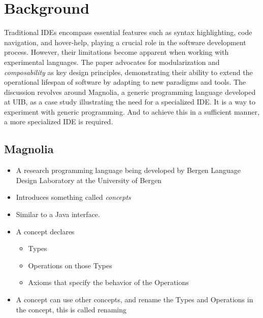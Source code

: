 \chapter{Background}

Traditional IDEs encompass essential features such as syntax highlighting, code
navigation, and hover-help, playing a crucial role in the software development
process. However, their limitations become apparent when working with
experimental languages. The paper advocates for modularization and \textit{composability}
as key design principles, demonstrating their ability to extend the operational
lifespan of software by adapting to new paradigms and tools. The discussion
revolves around Magnolia, a generic programming language developed at UIB, as a
case study illustrating the need for a specialized IDE. It is a way to experiment
with generic programming. And to achieve this in a sufficient manner, a more
specialized IDE is required.

\section{Magnolia}

\begin{itemize}
  \item A research programming language being developed by
    Bergen Language Design Laboratory at the University of Bergen
  \item Introduces something called \textit{concepts}
  \item Similar to a Java interface.
  \item A concept declares
    \begin{itemize}
      \item Types
      \item Operations on those Types
      \item Axioms that specify the behavior of the Operations
    \end{itemize}
  \item A concept can use other concepts, and rename the Types and Operations
    in the concept, this is called renaming
\end{itemize}

\begin{center}
  
\end{center}

\begin{center}
  
\end{center}


